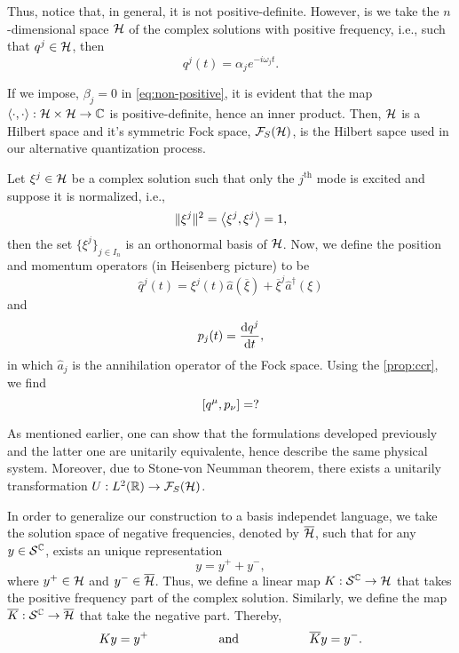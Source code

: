 Thus, notice that, in general, it is not positive-definite. However, is we take the \(n\)-dimensional space \({\mathcal{H}}\) of the complex solutions with positive frequency, i.e., such that \(q^j\in{\mathcal{H}}\), then
\begin{equation}
    q^j(t)=\alpha_je^{-i\omega_j t}.
\end{equation}

If we impose, \(\beta_j=0\) in \cref{eq:non-positive}, it is evident that the map \(\left\langle \cdot, \cdot\right\rangle:{\mathcal{H}}\times{\mathcal{H}}\to{\mathbb{C}}\) is positive-definite, hence an inner product. Then, \({\mathcal{H}}\) is a Hilbert space and it's symmetric Fock space, \({\mathcal{F}}_S({\mathcal{H}})\), is the Hilbert sapce used in our alternative quantization process.

Let \(\xi^j\in{\mathcal{H}}\) be a complex solution such that only the \(j^{\mathrm{th}}\) mode is excited and suppose it is normalized, i.e.,
\begin{equation}
    \lVert\xi^j\rVert^2=\left\langle \xi^j, \xi^j\right\rangle=1,
\end{equation}
then the set \(\{\xi^j\}_{j\in I_n}\) is an orthonormal basis of \({\mathcal{H}}\). Now, we define the position and momentum operators (in Heisenberg picture) to be
\begin{equation}
    \hat{q}^j(t)=\xi^j(t)\hat{a}\left(\overline{\xi}\right)+\overline{\xi}^j\hat{a}^{\dagger}(\xi)
\end{equation}
and
\begin{equation}
    p_j(t)=\diff{q^j}{t},
\end{equation}
in which \(\hat{a}_j\) is the annihilation operator of the Fock space. Using the \cref{prop:ccr}, we find
\begin{equation}
    \relax[q^\mu,p_\nu]=?
\end{equation}

As mentioned earlier, one can show that the formulations developed previously and the latter one are unitarily equivalente, hence describe the same physical system. Moreover, due to Stone-von Neumman theorem, there exists a unitarily transformation \(U:L^2({\mathbb{R}})\to{\mathcal{F}}_S({\mathcal{H}})\).

In order to generalize our construction to a basis independet language, we take the solution space of negative frequencies, denoted by \(\overline{{\mathcal{H}}}\), such that for any \(y\in{\mathcal{S}}^{{\mathbb{C}}}\), exists an unique representation
\begin{equation}
    y=y^++y^-,
\end{equation}
where \(y^+\in{\mathcal{H}}\) and \(y^-\in\overline{{\mathcal{H}}}\). Thus, we define a linear map \(K:{\mathcal{S}}^{\mathbb{C}}\to{\mathcal{H}}\) that takes the positive frequency part of the complex solution. Similarly, we define the map \(\overline{K}:{\mathcal{S}}^{\mathbb{C}}\to\overline{{\mathcal{H}}}\) that take the negative part. Thereby,
\begin{equation}
    Ky=y^+\hspace{2cm}\text{and}\hspace*{2cm}\overline{K}y=y^-.
\end{equation}

